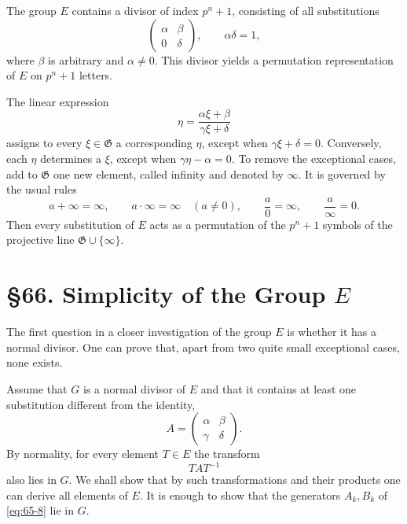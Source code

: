 \documentclass[11pt,a4paper]{book}
\newcommand{\webersection}[2]{\clearpage\section*{\S #1. #2}}
\begin{document}
The group \(E\) contains a divisor of index \(p^n+1\), consisting of all substitutions
\begin{equation}\label{eq:65-borel}
 \begin{pmatrix}\alpha&\beta\\0&\delta\end{pmatrix},
 \qquad \alpha\delta=1,
\end{equation}
where \(\beta\) is arbitrary and \(\alpha\ne0\).  This divisor yields a permutation representation of \(E\) on \(p^n+1\) letters.

The linear expression
\begin{equation}\label{eq:65-12}
 \eta=\frac{\alpha\xi+\beta}{\gamma\xi+\delta}
\end{equation}
assigns to every \(\xi\in\mathfrak G\) a corresponding \(\eta\), except when \(\gamma\xi+\delta=0\).  Conversely, each \(\eta\) determines a \(\xi\), except when \(\gamma\eta-\alpha=0\).  To remove the exceptional cases, add to \(\mathfrak G\) one new element, called infinity and denoted by \(\infty\).  It is governed by the usual rules
\[
 a+\infty=\infty,
 \qquad a\cdot\infty=\infty\quad(a\ne0),
 \qquad \frac{a}{0}=\infty,
 \qquad \frac{a}{\infty}=0.
\]
Then every substitution of \(E\) acts as a permutation of the \(p^n+1\) symbols of the projective line \(\mathfrak G\cup\{\infty\}\).

\webersection{66}{Simplicity of the Group \(E\)}

The first question in a closer investigation of the group \(E\) is whether it has a normal divisor.  One can prove that, apart from two quite small exceptional cases, none exists.

Assume that \(G\) is a normal divisor of \(E\) and that it contains at least one substitution different from the identity,
\begin{equation}\label{eq:66-1}
 A=\begin{pmatrix}\alpha&\beta\\\gamma&\delta\end{pmatrix}.
\end{equation}
By normality, for every element \(T\in E\) the transform
\begin{equation}\label{eq:66-2}
 TAT^{-1}
\end{equation}
also lies in \(G\).  We shall show that by such transformations and their products one can derive all elements of \(E\).  It is enough to show that the generators \(A_k,B_k\) of \eqref{eq:65-8} lie in \(G\).
\end{document}
